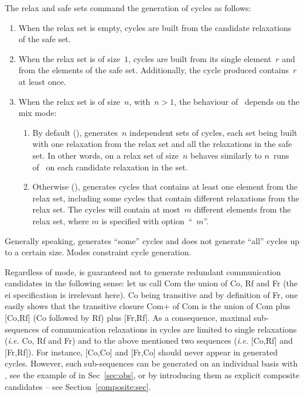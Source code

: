 The relax and safe sets command the generation of
cycles as follows:
\begin{enumerate}
\item When the relax set is empty,
cycles are built from the candidate relaxations of the safe set.
\item When the relax set is of size~$1$,
cycles are built from its single element~$r$ and from the elements of
the safe set. Additionally, the cycle produced contains~$r$ at least once.
\item
When the relax set is of size~$n$, with~$n > 1$,
the behaviour of~\diy{} depends on the mix mode:
\begin{enumerate}
\item
By default (),
\diy{} generates~$n$ independent sets of cycles,
each set being built with one relaxation from the relax set and all
the relaxations in the safe set.
In other words, \diy{} on a relax set of size~$n$ behaves similarly
to $n$~runs of~\diy{} on each candidate relaxation in the set.
\item Otherwise (), \diy{} generates cycles that contains
at least one element from the relax set, including some cycles
that contain different relaxations from the relax set.
The cycles will contain at most~$m$ different elements from the relax set,
where $m$ is specified with option~``~$m$''.
\end{enumerate}
\end{enumerate}

\label{mode:describe}Generally
speaking, \diy{} generates ``some'' cycles and does not generate
``all'' cycles up to a certain size. Modes constraint cycle generation.

Regardless of mode, \diy{} is guaranteed not to
generate redundant communication candidates in the following sense:
let us call Com the union of Co, Rf and Fr (the e\vbar{}i specification
is irrelevant here).
Co being transitive and by definition of Fr,
one easily shows that the transitive closure Com+ of Com is the union
of Com plus [Co,Rf] (Co followed by Rf) plus [Fr,Rf].
As a consequence, maximal sub-sequences of communication
relaxations in \diy{} cycles are limited
to  single relaxations (\emph{i.e.} Co, Rf and Fr)
and to the above mentioned two sequences
(\emph{i.e.} [Co,Rf] and  [Fr,Rf]).
For instance, [Co,Co] and [Fr,Co] should never appear in \diy{} generated
cycles. However, such sub-sequences can be generated on an individual basis with
\diyone, see the example of  in Sec~\ref{sec:obs},
or by introducing them as explicit composite candidates -- see Section~\ref{composite:sec}.

